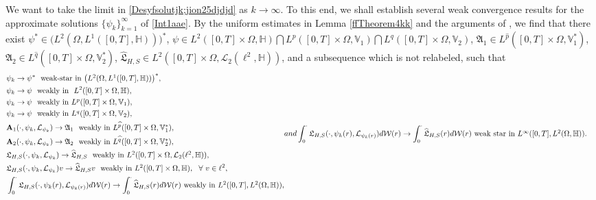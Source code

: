 \documentclass[11pt]{article}
\numberwithin{equation}{section}
\begin{document}
We want to take the limit in \eqref{Desyfsolutjk;jion25djdjd} as $k\rightarrow\infty$. To this end, we shall establish several weak convergence results for the approximate
 solutions $\{\psi_k\}_{k=1}^\infty$ of \eqref{Int1aae}.
By the uniform estimates
in  Lemma \ref{ffTheorem4kk} and the arguments of
 \cite{Wangjde,RWangsubmitted},
we find that there exist
	$\psi^*
	\in
	\big(L^ {2}(\Omega,
	L^1([0,T],\mathbb{H} ))\big)^*$,
	$\psi\in L^{2}(  [0,T]\times\Omega, \mathbb{H})
	\bigcap L^p([0,T]\times\Omega, \mathbb{V}_1)\bigcap L^q([0,T]\times\Omega, \mathbb{V}_2)$,
$\mathfrak{A}_1\in L^{\widehat{p}}([0,T]\times\Omega, \mathbb{V}^*_1)$,
$\mathfrak{A}_2\in L^{\widehat{q}}([0,T]\times\Omega, \mathbb{V}^*_2)$, $\widehat{\mathfrak{L}}_{H,S}\in
	L^2([0,T] \times\Omega,\mathcal{L}_2(
\ell^2, \mathbb{H}))$, and a subsequence which is not relabeled, such that
\begin{subequations}\begin{align}\label{Defia}
			&\psi_{k}\rightarrow \psi^*\ \
			\mbox{weak-star in $\big(L^ 2(\Omega,
				L^1([0,T],\mathbb{H} ))
				\big)
				^*$},
			\\&\label{Defibyy}
			\psi_{k}\rightarrow \psi\ \
			\mbox{weakly in } \
			L^{2}(  [0,T]\times\Omega, \mathbb{H}
			),
			\\&\label{Defsolution25b}
			\psi_{k}\rightarrow \psi\ \  \mbox{weakly in $L^p([0,T]\times\Omega, \mathbb{V}_1)$},		\\&\label{Defsolution25b1}\psi_{k}\rightarrow \psi\ \  \mbox{weakly in $L^q([0,T]\times\Omega, \mathbb{V}_2  )$},
			\\& \label{Defsolution25c}
			\mathbf{A}_1(\cdot,\psi_k,\mathcal{L}_{\psi_k}) \rightarrow \mathfrak{A}_1\ \  \mbox{weakly in $ L^{\widehat{p}}([0,T]\times\Omega, \mathbb{V}^*_1)$},
			\\& \label{Defsolution25c2}
			\mathbf{A}_2(\cdot,\psi_k,\mathcal{L}_{\psi_k}) \rightarrow \mathfrak{A}_2\ \  \mbox{weakly in $ L^{\widehat{q}}([0,T]\times\Omega, \mathbb{V}^*_2)$},
			\\&\label{inequalities1}
			\mathfrak{L}_{H,S}(\cdot,\psi_k,
\mathcal{L}_{\psi_k})\rightarrow \widehat{\mathfrak{L}}_{H,S} \ \ \mbox{weakly in $L^2([0,T]			\times\Omega,\mathcal{L}_2(\ell^2,
\mathbb{H}))$},
			\\\label{improved}
			&\mathfrak{L}_{H,S}(\cdot,\psi_k,\mathcal{L}_{\psi_k}
)v\rightarrow \widehat{\mathfrak{L}}_{H,S}v \ \ \mbox{weakly in $L^2([0,T]
				\times\Omega,\mathbb{H})$}, \ \ \forall\ v\in \ell^2,
			\\\label{improvedb}
			&\int_0^\cdot
			\mathfrak{L}_{H,S}(\cdot,\psi_k(r),
\mathcal{L}_{\psi_k(r)})
			d\mathcal{W}(r)
			\rightarrow\int_0^\cdot \widehat{\mathfrak{L}}_{H,S}(r)d\mathcal{W}(r)\ \mbox{weakly in $L^2([0,T], L^2(\Omega,\mathbb{H}))$},
		\end{align}
		and
		\begin{align}
			\label{improvedbcc}
			&\int_0^\cdot
			\mathfrak{L}_{H,S}(\cdot,\psi_k(r),
\mathcal{L}_{\psi_k(r)})
			d\mathcal{W}(r)
			\rightarrow\int_0^\cdot \widehat{\mathfrak{L}}_{H,S}(r)d\mathcal{W}(r)\ \mbox{weak star  in $L^\infty([0,T], L^2(\Omega,\mathbb{H}))$}.
		\end{align}
	\end{subequations}
\end{document}
